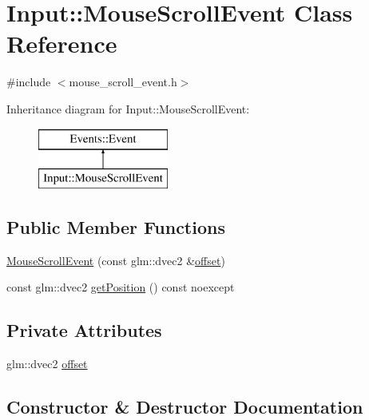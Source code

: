 \hypertarget{class_input_1_1_mouse_scroll_event}{}\section{Input\+:\+:Mouse\+Scroll\+Event Class Reference}
\label{class_input_1_1_mouse_scroll_event}


{\ttfamily \#include $<$mouse\+\_\+scroll\+\_\+event.\+h$>$}

Inheritance diagram for Input\+:\+:Mouse\+Scroll\+Event\+:\begin{figure}[H]
\begin{center}
\leavevmode
\includegraphics[height=2.000000cm]{class_input_1_1_mouse_scroll_event}
\end{center}
\end{figure}
\subsection*{Public Member Functions}
\begin{DoxyCompactItemize}
\item 
\hyperlink{class_input_1_1_mouse_scroll_event_aa5f6296ad33532b5a3c0bb57815415f7}{Mouse\+Scroll\+Event} (const glm\+::dvec2 \&\hyperlink{class_input_1_1_mouse_scroll_event_a6163719586771e6861bca6dd89476d4c}{offset})
\item 
const glm\+::dvec2 \hyperlink{class_input_1_1_mouse_scroll_event_a656e7f003aefd9ad5ebebc2093306de3}{get\+Position} () const noexcept
\end{DoxyCompactItemize}
\subsection*{Private Attributes}
\begin{DoxyCompactItemize}
\item 
glm\+::dvec2 \hyperlink{class_input_1_1_mouse_scroll_event_a6163719586771e6861bca6dd89476d4c}{offset}
\end{DoxyCompactItemize}


\subsection{Constructor \& Destructor Documentation}
\hypertarget{class_input_1_1_mouse_scroll_event_aa5f6296ad33532b5a3c0bb57815415f7}{}
